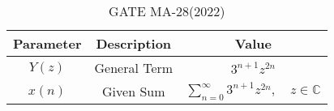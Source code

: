 
\begin{table}[h]
  \centering
  \begin{tabular}{|c|c|c|}
    \hline
Parameter & Description & Value \\ \hline
$Y(z)$ & General Term & $3^{n+1}z^{2n}$\\
\hline
$x(n)$ & Given Sum & $\sum_{n=0}^{\infty} 3^{n+1}z^{2n}, \quad z \in \mathbb{C} $\\
\hline
  \end{tabular}
  \vspace{2mm}
  \caption{GATE MA-28(2022)}
\end{table}



